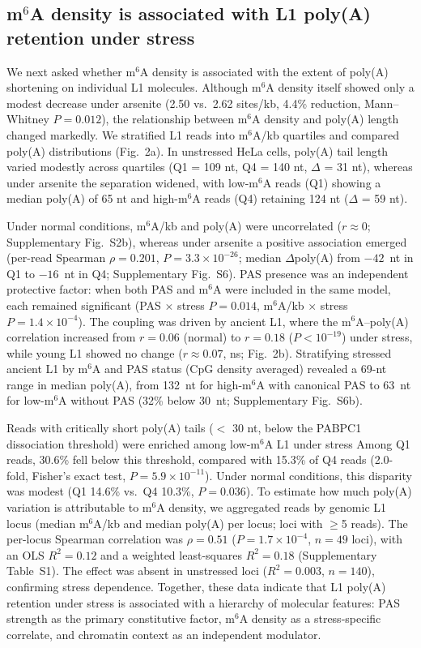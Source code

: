 \documentclass[11pt]{article}
\newcommand{\msix}{m$^6$A}
\begin{document}
\subsection{\msix{} density is associated with L1 poly(A) retention under stress}

We next asked whether \msix{} density is associated with the extent of
poly(A) shortening on individual L1 molecules. Although \msix{} density
itself showed only a modest decrease under arsenite (2.50 vs.\ 2.62
sites/kb, 4.4\% reduction, Mann--Whitney $P = 0.012$), the relationship
between \msix{} density and poly(A) length changed markedly. We
stratified L1 reads into \msix{}/kb quartiles and compared poly(A)
distributions (Fig.~2a). In unstressed HeLa cells, poly(A) tail length
varied modestly across quartiles (Q1 = 109 nt, Q4 = 140 nt,
$\Delta$ = 31 nt), whereas under arsenite the separation widened, with
low-\msix{} reads (Q1) showing a median poly(A) of 65 nt and
high-\msix{} reads (Q4) retaining 124 nt ($\Delta$ = 59 nt).

Under normal conditions, \msix{}/kb and poly(A) were uncorrelated
($r \approx 0$; Supplementary Fig.~S2b), whereas under arsenite a
positive association emerged (per-read Spearman $\rho = 0.201$,
$P = 3.3 \times 10^{-26}$; median $\Delta$poly(A) from $-42$~nt in Q1
to $-16$~nt in Q4; Supplementary Fig.~S6). PAS presence was an
independent protective factor: when both PAS and \msix{} were included
in the same model, each
remained significant (PAS $\times$ stress $P = 0.014$, \msix{}/kb
$\times$ stress $P = 1.4 \times 10^{-4}$). The coupling was driven by
ancient L1, where the \msix{}--poly(A) correlation increased from
$r = 0.06$ (normal) to $r = 0.18$ ($P < 10^{-19}$) under stress, while
young L1 showed no change ($r \approx 0.07$, ns; Fig.~2b). Stratifying
stressed ancient L1 by \msix{} and PAS status (CpG density averaged)
revealed a 69-nt range in median poly(A), from 132~nt for high-\msix{}
with canonical PAS to 63~nt for low-\msix{} without PAS (32\%
below 30~nt; Supplementary Fig.~S6b).

Reads with critically short poly(A) tails ($<$ 30 nt, below the PABPC1
dissociation threshold) were enriched among low-\msix{} L1 under stress
Among Q1 reads, 30.6\% fell below this threshold, compared with
15.3\% of Q4 reads (2.0-fold, Fisher's exact test,
$P = 5.9 \times 10^{-11}$).
Under normal conditions, this disparity was modest (Q1 14.6\% vs.\ Q4
10.3\%, $P = 0.036$). To estimate how much poly(A) variation is
attributable to \msix{} density, we aggregated reads by genomic L1 locus
(median \msix{}/kb and median poly(A) per locus; loci with $\geq$5
reads). The per-locus Spearman correlation was $\rho = 0.51$
($P = 1.7 \times 10^{-4}$, $n = 49$ loci), with an OLS $R^2 = 0.12$ and a
weighted least-squares $R^2 = 0.18$ (Supplementary Table~S1). The
effect was absent in unstressed loci ($R^2 = 0.003$,
$n = 140$), confirming stress dependence. Together, these data indicate
that L1 poly(A) retention under stress is associated with a hierarchy of
molecular features: PAS strength as the primary constitutive factor,
\msix{} density as a stress-specific correlate, and
chromatin context as an independent modulator.
\end{document}
